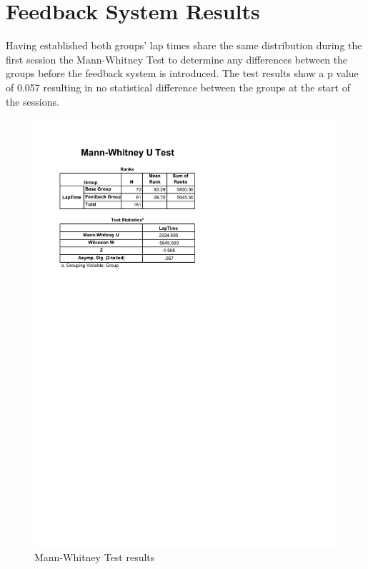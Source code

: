 \section{Feedback System Results}
\label{sec:eval-feedbackSysResults}
Having established both groups' lap times share the same distribution during the first session the Mann-Whitney Test to determine any differences between the groups before the feedback system is introduced. The test results show a p value of 0.057 resulting in no statistical difference between the groups at the start of the sessions.

\begin{figure}[!htb]
	\centering
	\includegraphics[width=\textwidth]{charts/Mann-Whitney.pdf}
	\caption[Mann-Whitney]{Mann-Whitney Test results}
	\label{fig:chart-KolmogorowSmimov}
\end{figure}

